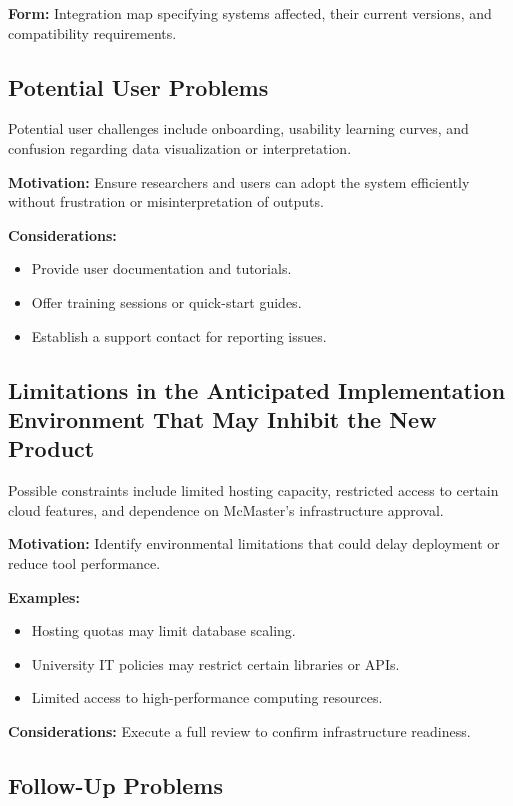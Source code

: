 \documentclass[12pt]{article}
\begin{document}
\textbf{Form:} Integration map specifying systems affected, their current versions, and compatibility requirements.

\subsection{Potential User Problems}

Potential user challenges include onboarding, usability learning curves, and confusion regarding data visualization or interpretation.

\textbf{Motivation:} Ensure researchers and users can adopt the system efficiently without frustration or misinterpretation of outputs.

\textbf{Considerations:}
\begin{itemize}
    \item Provide user documentation and tutorials.
    \item Offer training sessions or quick-start guides.
    \item Establish a support contact for reporting issues.
\end{itemize}

\subsection{Limitations in the Anticipated Implementation Environment That May Inhibit the New Product}

Possible constraints include limited hosting capacity, restricted access to certain cloud features, and dependence on McMaster’s infrastructure approval.

\textbf{Motivation:} Identify environmental limitations that could delay deployment or reduce tool performance.

\textbf{Examples:}
\begin{itemize}
    \item Hosting quotas may limit database scaling.
    \item University IT policies may restrict certain libraries or APIs.
    \item Limited access to high-performance computing resources.
\end{itemize}

\textbf{Considerations:} Execute a full review to confirm infrastructure readiness.

\subsection{Follow-Up Problems}
\end{document}
